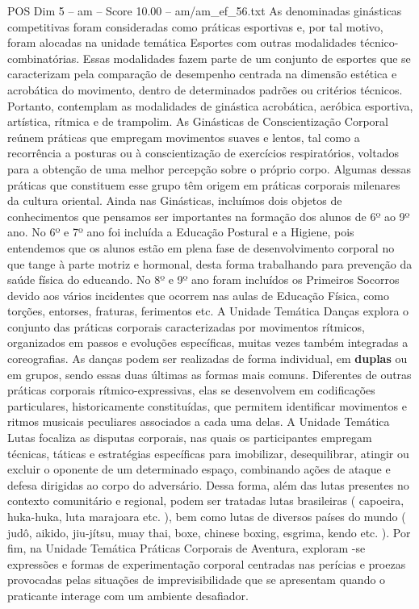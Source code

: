 \begin{textsample}{POS Dim 5 – am – Score 10.00 – am/am\_ef\_56.txt}
As denominadas ginásticas competitivas foram consideradas como práticas esportivas e, por tal motivo, foram alocadas na unidade temática Esportes com outras modalidades técnico-combinatórias.
Essas modalidades fazem parte de um conjunto de esportes que se caracterizam pela comparação de desempenho centrada na dimensão estética e acrobática do movimento, dentro de determinados padrões ou critérios técnicos.
Portanto, contemplam as modalidades de ginástica acrobática, aeróbica esportiva, artística, rítmica e de trampolim.
As Ginásticas de Conscientização Corporal reúnem práticas que empregam movimentos suaves e lentos, tal como a recorrência a posturas ou à conscientização de exercícios respiratórios, voltados para a obtenção de uma melhor percepção sobre o próprio corpo.
Algumas dessas práticas que constituem esse grupo têm origem em práticas corporais milenares da cultura oriental.
Ainda nas Ginásticas, incluímos dois objetos de conhecimentos que pensamos ser importantes na formação dos alunos de 6º ao 9º ano.
No 6º e 7º ano foi incluída a Educação Postural e a Higiene, pois entendemos que os alunos estão em plena fase de desenvolvimento corporal no que tange à parte motriz e hormonal, desta forma trabalhando para prevenção da saúde física do educando.
No 8º e 9º ano foram incluídos os Primeiros Socorros devido aos vários incidentes que ocorrem nas aulas de Educação Física, como torções, entorses, fraturas, ferimentos etc.
A Unidade Temática Danças explora o conjunto das práticas corporais caracterizadas por movimentos rítmicos, organizados em passos e evoluções específicas, muitas vezes também integradas a coreografias.
As danças podem ser realizadas de forma individual, em \textbf{duplas} ou em grupos, sendo essas duas últimas as formas mais comuns.
Diferentes de outras práticas corporais rítmico-expressivas, elas se desenvolvem em codificações particulares, historicamente constituídas, que permitem identificar movimentos e ritmos musicais peculiares associados a cada uma delas.
A Unidade Temática Lutas focaliza as disputas corporais, nas quais os participantes empregam técnicas, táticas e estratégias específicas para imobilizar, desequilibrar, atingir ou excluir o oponente de um determinado espaço, combinando ações de ataque e defesa dirigidas ao corpo do adversário.
Dessa forma, além das lutas presentes no contexto comunitário e regional, podem ser tratadas lutas brasileiras ( capoeira, huka-huka, luta marajoara etc. ), bem como lutas de diversos países do mundo ( judô, aikido, jiu-jítsu, muay thai, boxe, chinese boxing, esgrima, kendo etc. ).
Por fim, na Unidade Temática Práticas Corporais de Aventura, exploram -se expressões e formas de experimentação corporal centradas nas perícias e proezas provocadas pelas situações de imprevisibilidade que se apresentam quando o praticante interage com um ambiente desafiador.

\end{textsample}
